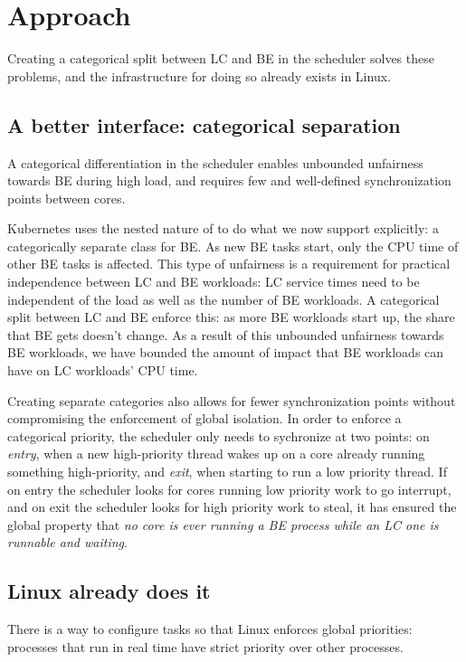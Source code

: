 \section{Approach}\label{s:approach}


Creating a categorical split between LC and BE in the scheduler solves these
problems, and the infrastructure for doing so already exists in Linux.

\subsection{A better interface: categorical separation}\label{ss:interface}

A categorical differentiation in the scheduler enables unbounded unfairness
towards BE during high load, and requires few and well-defined synchronization
points between cores.

Kubernetes uses the nested nature of \cgroups{} to do what we now support
explicitly: a categorically separate class for BE. As new BE tasks start, only
the CPU time of other BE tasks is affected. This type of unfairness is a
requirement for practical independence between LC and BE workloads: LC service
times need to be independent of the load as well as the number of BE workloads.
A categorical split between LC and BE enforce this: as more BE workloads start
up, the share that BE gets doesn't change. As a result of this unbounded
unfairness towards BE workloads, we have bounded the amount of impact that BE
workloads can have on LC workloads' CPU time.

Creating separate categories also allows for fewer synchronization points
without compromising the enforcement of global isolation. In order to enforce a
categorical priority, the scheduler only needs to sychronize at two points: on
\textit{entry}, when a new high-priority thread wakes up on a core already
running something high-priority, and \textit{exit}, when starting to run a low
priority thread. If on entry the scheduler looks for cores running low priority
work to go interrupt, and on exit the scheduler looks for high priority work to
steal, it has ensured the global property that \textit{no core is ever running a
BE process while an LC one is runnable and waiting}.


\subsection{Linux already does it}

There is a way to configure tasks so that Linux enforces global priorities:
processes that run in real time have strict priority over other processes.


